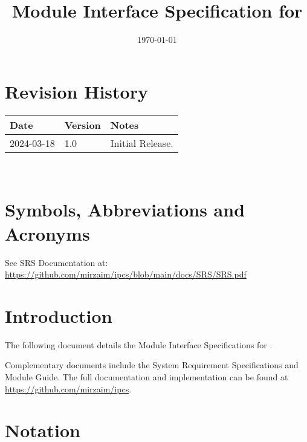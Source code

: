 \documentclass[12pt, titlepage]{article}
\begin{document}
\title{Module Interface Specification for \progname{}}

\author{\authname}

\date{\today}

\maketitle


\section{Revision History}

\begin{tabularx}{\textwidth}{p{3cm}p{2cm}X}
\toprule {\bf Date} & {\bf Version} & {\bf Notes}\\
\midrule
2024-03-18 & 1.0 & Initial Release.\\
\bottomrule
\end{tabularx}

~\newpage

\section{Symbols, Abbreviations and Acronyms}

See SRS Documentation at: \\
\url{https://github.com/mirzaim/ipcs/blob/main/docs/SRS/SRS.pdf}


\newpage

\tableofcontents

\newpage


\section{Introduction}

The following document details the Module Interface Specifications for
\progname{}.

Complementary documents include the System Requirement Specifications
and Module Guide.  The full documentation and implementation can be
found at \url{https://github.com/mirzaim/ipcs}. 

\section{Notation}
\end{document}
